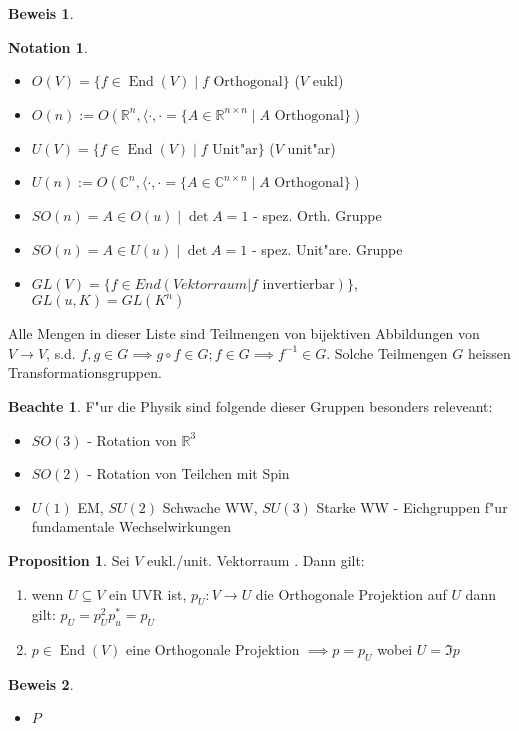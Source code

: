 \documentclass[oneside,fontsize=11pt,paper=a4,BCOR=0mm,DIV=12,automark,headsepline]{scrbook}
\DeclareMathOperator{\mEnd}{End}
\theoremstyle{remark}
\theoremstyle{definition}
\newtheorem*{notte}{Beachte}
\newtheorem*{notation}{Notation}
\newtheorem*{proposition}{Proposition}
\theoremstyle{definition}
\newtheorem*{prof}{Beweis}
\theoremstyle{remark}
\begin{document}
\begin{prof}
  \begin{itemize}
  \end{itemize}
\end{prof}
\begin{notation}
  \begin{itemize}
 \item $O(V)=\{f\in\mEnd (V) \mid f\text{ Orthogonal}\}$ ($V$ eukl)
  \item $O(n):= O(\mathbb{R}^n, \langle{\cdot, \cdot} = \{A\in
    \mathbb{R}^{n\times  n} \mid A \text{ Orthogonal}\})$
    \item $U(V)=\{f\in\mEnd (V) \mid f\text{ Unit"ar}\}$ ($V$ unit"ar)
  \item $U(n):= O(\mathbb{C}^n, \langle{\cdot, \cdot} = \{A\in
    \mathbb{C}^{n\times  n} \mid A \text{ Orthogonal}\})$
  \item $S O(n) = {A\in O(u) \mid \det A = 1}$ - spez. Orth. Gruppe
  \item $S  O(n) = {A\in U(u) \mid \det A = 1}$ - spez. Unit"are. Gruppe
  \item $GL(V)=\{f\in End(Vektorraum | f \text{ invertierbar})\}$, $GL(u, K)=GL(K^n)$
  \end{itemize}

  Alle Mengen in dieser Liste sind Teilmengen von bijektiven Abbildungen von
  $V\rightarrow V$, s.d. $f,g\in G \implies g\circ f \in G; f\in G \implies
  f^{-1}\in G$. Solche Teilmengen $G$ heissen Transformationsgruppen.
\end{notation}

\begin{notte}
  F"ur die Physik sind folgende dieser Gruppen besonders releveant:
  \begin{itemize}
  \item $SO(3)$ - Rotation von $\mathbb{R}^3$
  \item $SO(2)$ - Rotation von Teilchen mit Spin
  \item $U(1)$ EM, $SU(2)$ Schwache WW, $SU(3)$ Starke WW - Eichgruppen f"ur fundamentale Wechselwirkungen
  \end{itemize}
\end{notte}

\begin{proposition}
  Sei $V$ eukl./unit. Vektorraum . Dann gilt:
  \begin{enumerate}
  \item wenn $U\subseteq V$ ein UVR ist, $p_U: V\rightarrow U$ die Orthogonale
    Projektion auf $U$ dann gilt: $p_U=p_U^2 p_u^*= p_U$
    
  \item $p\in \mEnd (V)$ eine Orthogonale Projektion $\implies p = p_U $ wobei
    $U=\Im p$
  \end{enumerate}
\end{proposition}
\begin{prof}
  \begin{itemize}
  \item $P$
  \end{itemize}
\end{prof}
\end{document}
